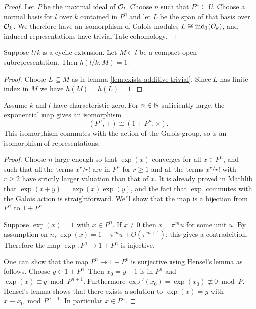 \begin{proof}
	Let $P$ be the maximal ideal of ${\mathcal O}_l$.
	Choose $n$ such that $P^n \subseteq U$.
	Choose a normal basis for $l$ over $k$ contained in $P^n$
	and let $L$ be the span of that basis over ${\mathcal O}_k$.
	We therefore have an isomorphism of Galois modules $L \cong \mathrm{ind}_1({\mathcal O}_k)$,
	and induced representations have trivial Tate cohomology.
\end{proof}

\begin{lemma} \label{lem:herbrand compact open additive}
	Suppose $l/k$ is a cyclic extension.
	Let $M \subset l$ be a compact open subrepresentation.
	Then $h(l/k,M)=1$.
\end{lemma}

\begin{proof}
	Choose $L \subseteq M$ as in lemma \ref{lem:exists additive trivial}.
	Since $L$ has finite index in $M$ we have $h(M) = h(L) = 1$.
\end{proof}


\begin{lemma}\label{lem:local isomorphism}
	Assume $k$ and $l$ have characteristic zero.
	For $n \in {\mathbb N}$ sufficiently large, the
	exponential map gives an isomorphism
	\[
		(P^n,+) \cong (1 + P^n, \times).
	\]
	This isomorphism commutes with the action of the Galois group, so is an
	isomorphism of representations.
\end{lemma}

\begin{proof}
	Choose $n$ large enough so that $\exp(x)$ converges for all $x \in P^n$,
	and such that all the terms $x^r/r!$ are in $P^n$ for $r \ge 1$
	and all the terms $x^r / r!$ with $r \ge 2$ have strictly larger valuation than that of $x$.
	It is already proved in Mathlib that $\exp(x+y)=\exp(x)\exp(y)$, and the fact that $\exp$ commutes
	with the Galois action is straightforward.
	We'll show that the map is a bijection from $P^n$ to $1+P^n$.

	Suppose $\exp(x)=1$ with $x \in P^n$.
	If $x \ne 0$ then $x = \pi^mu$ for some unit $u$.
	By assumption on $n$, $\exp(x) = 1 + \pi^m u + O(\pi^{m+1})$; this gives a contradcition.
	Therefore the map $\exp : P^n \to 1+P^n$ is injective.

	One can show that the map $P^n \to 1+P^n$ is surjective using Hensel's lemma as follows.
	Choose $y \in 1+P^n$. Then $x_0 = y-1$ is in $P^n$ and $\exp(x) \equiv y \bmod P^{n+1}$.
	Furthermore $\exp'(x_0) = \exp(x_0) \not\equiv 0 \bmod P$. Hensel's lemma shows that there exists
	a solution to $\exp(x)=y$ with $x \equiv x_0 \bmod P^{n+1}$.
	In particular $x \in P^n$.
\end{proof}


